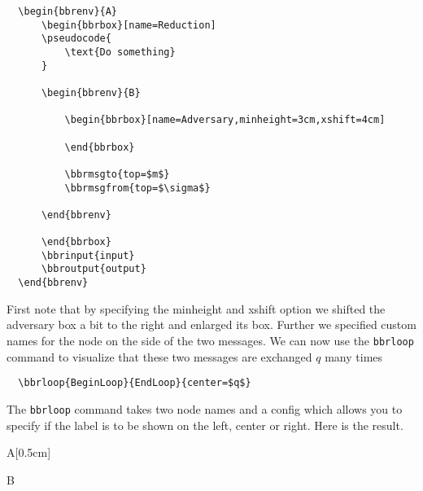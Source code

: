 \documentclass[a4paper]{report}
\begin{document}
  \begin{lstlisting}
  \begin{bbrenv}{A}
	  \begin{bbrbox}[name=Reduction]
	  \pseudocode{
		  \text{Do something} 
	  }
  
	  \begin{bbrenv}{B}
  
		  \begin{bbrbox}[name=Adversary,minheight=3cm,xshift=4cm]
  
		  \end{bbrbox}
		  
		  \bbrmsgto{top=$m$}
		  \bbrmsgfrom{top=$\sigma$}
  
	  \end{bbrenv}
  
	  \end{bbrbox}
	  \bbrinput{input}
	  \bbroutput{output}
  \end{bbrenv}
  \end{lstlisting}
  
  First note that by specifying the minheight and xshift option we shifted the adversary box a bit to the right
  and enlarged its box. Further we specified custom names for the node on the  side of the two messages. We
  can now use the \lstinline$bbrloop$ command to visualize that these two messages are exchanged $q$ many times
  \begin{lstlisting}
  \bbrloop{BeginLoop}{EndLoop}{center=$q$}
  \end{lstlisting}
  The \lstinline$bbrloop$ command takes two node names and a config which allows you to specify if the label is
  to be shown on the left, center or right. Here is the result.
  
  \begin{bbrenv}[1cm]{A}[0.5cm]
	  \begin{bbrbox}[name=Reduction]
  
	  \begin{bbrenv}{B}
  
		  \begin{bbrbox}[name=Adversary,minheight=3cm,xshift=4cm]
  
		  \end{bbrbox}
		  
		  \bbrmsgspace{0.5cm}
  
	  \end{bbrenv}
  
	  \end{bbrbox}
  \end{bbrenv}
  
\end{document}
